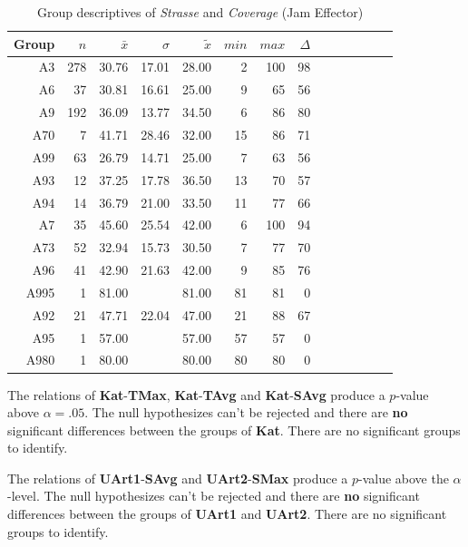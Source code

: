\begin{table}[ht]
	\tiny
	\centering
	\begin{tabular}{rrrrrrrrrrrrrr}
		\toprule
		Group & $n$ & $\bar{x}$ & $\sigma$ & $\tilde{x}$ & $min$ & $max$ & $\Delta$ \\
		\midrule
		A3   & 278 & 30.76 & 17.01 & 28.00 & 2  & 100 & 98 \\ 
		A6   & 37  & 30.81 & 16.61 & 25.00 & 9  & 65  & 56 \\ 
		A9   & 192 & 36.09 & 13.77 & 34.50 & 6  & 86  & 80 \\ 
		A70  & 7   & 41.71 & 28.46 & 32.00 & 15 & 86  & 71 \\ 
		A99  & 63  & 26.79 & 14.71 & 25.00 & 7  & 63  & 56 \\ 
		A93  & 12  & 37.25 & 17.78 & 36.50 & 13 & 70  & 57 \\ 
		A94  & 14  & 36.79 & 21.00 & 33.50 & 11 & 77  & 66 \\ 
		A7   & 35  & 45.60 & 25.54 & 42.00 & 6  & 100 & 94 \\ 
		A73  & 52  & 32.94 & 15.73 & 30.50 & 7  & 77  & 70 \\ 
		A96  & 41  & 42.90 & 21.63 & 42.00 & 9  & 85  & 76 \\ 
		A995 & 1   & 81.00 &  	   & 81.00 & 81 & 81  & 0 \\ 
		A92  & 21  & 47.71 & 22.04 & 47.00 & 21 & 88  & 67 \\ 
		A95  & 1   & 57.00 &  	   & 57.00 & 57 & 57  & 0 \\ 
		A980 & 1   & 80.00 &  	   & 80.00 & 80 & 80  & 0 \\ 
		\bottomrule
	  \end{tabular}
    \caption{Group descriptives of \textit{Strasse} and \textit{Coverage} (Jam Effector)}
    \label{tbl:descriptives_baysis_effector_Strasse_Cov}
\end{table}

The relations of \textbf{Kat}-\textbf{TMax}, \textbf{Kat}-\textbf{TAvg} and \textbf{Kat}-\textbf{SAvg} produce a $p$-value above $\alpha=.05$. The null hypothesizes can't be rejected and there are \textbf{no} significant differences between the groups of \textbf{Kat}. There are no significant groups to identify.

The relations of \textbf{UArt1}-\textbf{SAvg} and \textbf{UArt2}-\textbf{SMax} produce a $p$-value above the $\alpha$-level. The null hypothesizes can't be rejected and there are \textbf{no} significant differences between the groups of \textbf{UArt1} and \textbf{UArt2}. There are no significant groups to identify.

